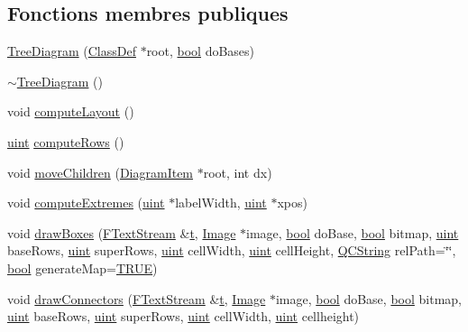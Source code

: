 \subsection*{Fonctions membres publiques}
\begin{DoxyCompactItemize}
\item 
\hyperlink{class_tree_diagram_ad735ca99aceef0ccf0cfbcb761dbcc84}{Tree\+Diagram} (\hyperlink{class_class_def}{Class\+Def} $\ast$root, \hyperlink{qglobal_8h_a1062901a7428fdd9c7f180f5e01ea056}{bool} do\+Bases)
\item 
\hyperlink{class_tree_diagram_aa7be6100836f51925f54fa5980c6b481}{$\sim$\+Tree\+Diagram} ()
\item 
void \hyperlink{class_tree_diagram_a940a3aaf1985a9f2ff19dc95aa91716b}{compute\+Layout} ()
\item 
\hyperlink{qglobal_8h_a4d3943ddea65db7163a58e6c7e8df95a}{uint} \hyperlink{class_tree_diagram_a5012275fc688c77e729ad40ebf666582}{compute\+Rows} ()
\item 
void \hyperlink{class_tree_diagram_a80bd153a4b94ab9513d9d957b9953b1c}{move\+Children} (\hyperlink{class_diagram_item}{Diagram\+Item} $\ast$root, int dx)
\item 
void \hyperlink{class_tree_diagram_af73eec062500230c3fafe7095192d088}{compute\+Extremes} (\hyperlink{qglobal_8h_a4d3943ddea65db7163a58e6c7e8df95a}{uint} $\ast$label\+Width, \hyperlink{qglobal_8h_a4d3943ddea65db7163a58e6c7e8df95a}{uint} $\ast$xpos)
\item 
void \hyperlink{class_tree_diagram_afb5cfc60c8521a8db37b6f408b9dee95}{draw\+Boxes} (\hyperlink{class_f_text_stream}{F\+Text\+Stream} \&\hyperlink{058__bracket__recursion_8tcl_a69e959f6901827e4d8271aeaa5fba0fc}{t}, \hyperlink{class_image}{Image} $\ast$image, \hyperlink{qglobal_8h_a1062901a7428fdd9c7f180f5e01ea056}{bool} do\+Base, \hyperlink{qglobal_8h_a1062901a7428fdd9c7f180f5e01ea056}{bool} bitmap, \hyperlink{qglobal_8h_a4d3943ddea65db7163a58e6c7e8df95a}{uint} base\+Rows, \hyperlink{qglobal_8h_a4d3943ddea65db7163a58e6c7e8df95a}{uint} super\+Rows, \hyperlink{qglobal_8h_a4d3943ddea65db7163a58e6c7e8df95a}{uint} cell\+Width, \hyperlink{qglobal_8h_a4d3943ddea65db7163a58e6c7e8df95a}{uint} cell\+Height, \hyperlink{class_q_c_string}{Q\+C\+String} rel\+Path=\char`\"{}\char`\"{}, \hyperlink{qglobal_8h_a1062901a7428fdd9c7f180f5e01ea056}{bool} generate\+Map=\hyperlink{qglobal_8h_a04a6422a52070f0dc478693da640242b}{T\+R\+U\+E})
\item 
void \hyperlink{class_tree_diagram_afcb546f45e7cc4c69a8ce574ec518292}{draw\+Connectors} (\hyperlink{class_f_text_stream}{F\+Text\+Stream} \&\hyperlink{058__bracket__recursion_8tcl_a69e959f6901827e4d8271aeaa5fba0fc}{t}, \hyperlink{class_image}{Image} $\ast$image, \hyperlink{qglobal_8h_a1062901a7428fdd9c7f180f5e01ea056}{bool} do\+Base, \hyperlink{qglobal_8h_a1062901a7428fdd9c7f180f5e01ea056}{bool} bitmap, \hyperlink{qglobal_8h_a4d3943ddea65db7163a58e6c7e8df95a}{uint} base\+Rows, \hyperlink{qglobal_8h_a4d3943ddea65db7163a58e6c7e8df95a}{uint} super\+Rows, \hyperlink{qglobal_8h_a4d3943ddea65db7163a58e6c7e8df95a}{uint} cell\+Width, \hyperlink{qglobal_8h_a4d3943ddea65db7163a58e6c7e8df95a}{uint} cellheight)
\end{DoxyCompactItemize}


